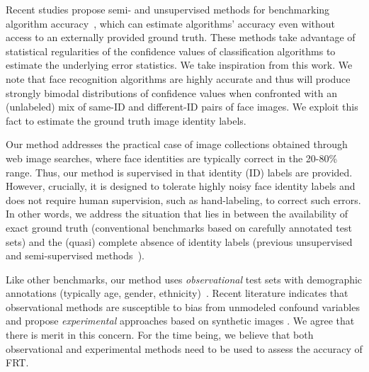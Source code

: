 Recent studies propose semi- and unsupervised methods for benchmarking algorithm accuracy~\cite{welinder2013lazy,ji2020can,chouldechova2022unsupervised}, which can estimate algorithms' accuracy even without access to an externally provided ground truth. These methods take advantage of statistical regularities of the confidence values of classification algorithms to estimate the underlying error statistics. We take inspiration from this work. We note that face recognition algorithms are highly accurate and thus will produce strongly bimodal distributions of confidence values when confronted with an (unlabeled) mix of same-ID and different-ID pairs of face images. We exploit this fact to estimate the ground truth image identity labels. 

Our method addresses the practical case of image collections obtained through web image searches, where face identities are typically correct in the 20-80\% range. Thus, our method is supervised in that identity (ID) labels are provided. However, crucially, it is designed to tolerate highly noisy face identity labels and does not require human supervision, such as hand-labeling, to correct such errors. In other words, we address the situation that lies in between the availability of exact ground truth (conventional benchmarks based on carefully annotated test sets) and the (quasi) complete absence of identity labels (previous unsupervised and semi-supervised methods~\cite{welinder2013lazy,chouldechova2022unsupervised}). 

 Like other benchmarks, our method uses {\em observational} test sets with demographic annotations (typically age, gender, ethnicity)~\cite{ricanek2006morph,liu2015deep,grother2019face,karkkainen2021fairface}. Recent literature indicates that observational methods are susceptible to bias from unmodeled confound variables and propose {\em experimental} approaches based on synthetic images \cite{balakrishnan2021towards,liang2023benchmarking}. We agree that there is merit in this concern. For the time being, we believe that both observational and experimental methods need to be used to assess the accuracy of FRT.